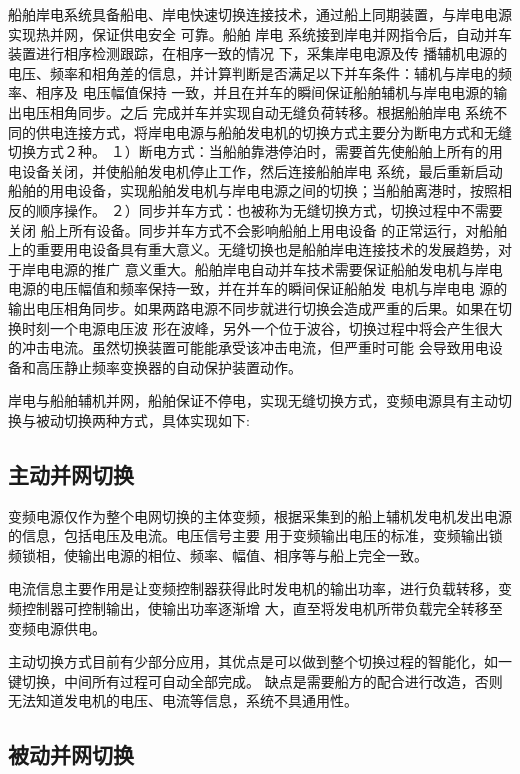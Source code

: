 船舶岸电系统具备船电、岸电快速切换连接技术，通过船上同期装置，与岸电电源实现热并网，保证供电安全
可靠。船舶 岸电 系统接到岸电并网指令后，自动并车装置进行相序检测跟踪，在相序一致的情况 下，采集岸电电源及传
播辅机电源的电压、频率和相角差的信息，并计算判断是否满足以下并车条件：辅机与岸电的频率、相序及 电压幅值保持
一致，并且在并车的瞬间保证船舶辅机与岸电电源的输出电压相角同步。之后 完成并车并实现自动无缝负荷转移。根据船舶岸电
系统不同的供电连接方式，将岸电电源与船舶发电机的切换方式主要分为断电方式和无缝切换方式２种\cite{SP10}。
１）断电方式：当船舶靠港停泊时，需要首先使船舶上所有的用电设备关闭，并使船舶发电机停止工作，然后连接船舶岸电
系统，最后重新启动船舶的用电设备，实现船舶发电机与岸电电源之间的切换；当船舶离港时，按照相反的顺序操作。
２）同步并车方式：也被称为无缝切换方式，切换过程中不需要关闭 船上所有设备。同步并车方式不会影响船舶上用电设备
的正常运行，对船舶上的重要用电设备具有重大意义。无缝切换也是船舶岸电连接技术的发展趋势，对于岸电电源的推广
意义重大。船舶岸电自动并车技术需要保证船舶发电机与岸电电源的电压幅值和频率保持一致，并在并车的瞬间保证船舶发
电机与岸电电 源的输出电压相角同步。如果两路电源不同步就进行切换会造成严重的后果。如果在切换时刻一个电源电压波
形在波峰，另外一个位于波谷，切换过程中将会产生很大的冲击电流。虽然切换装置可能能承受该冲击电流，但严重时可能
会导致用电设备和高压静止频率变换器的自动保护装置动作。

岸电与船舶辅机并网，船舶保证不停电，实现无缝切换方式，变频电源具有主动切换与被动切换两种方式，具体实现如下:

\subsection{主动并网切换}

变频电源仅作为整个电网切换的主体变频，根据采集到的船上辅机发电机发出电源的信息，包括电压及电流。电压信号主要
用于变频输出电压的标准，变频输出锁频锁相，使输出电源的相位、频率、幅值、相序等与船上完全一致。

电流信息主要作用是让变频控制器获得此时发电机的输出功率，进行负载转移，变频控制器可控制输出，使输出功率逐渐增
大，直至将发电机所带负载完全转移至变频电源供电。

主动切换方式目前有少部分应用，其优点是可以做到整个切换过程的智能化，如一键切换，中间所有过程可自动全部完成。
缺点是需要船方的配合进行改造，否则无法知道发电机的电压、电流等信息，系统不具通用性。

\subsection{被动并网切换}


